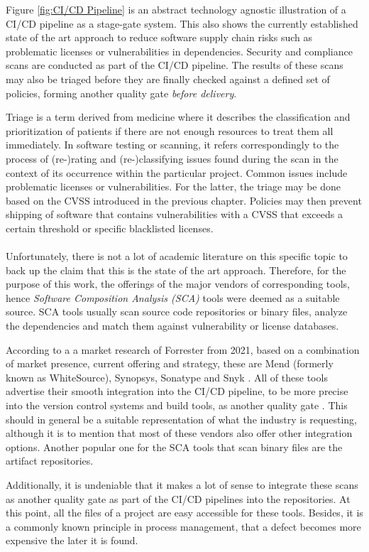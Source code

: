Figure \ref{fig:CI/CD Pipeline} is an abstract technology agnostic illustration of a CI/CD pipeline as a stage-gate system. This also shows the currently established state of the art approach to reduce software supply chain risks such as problematic licenses or vulnerabilities in dependencies. Security and compliance scans are conducted as part of the CI/CD pipeline. The results of these scans may also be triaged before they are finally checked against a defined set of policies, forming another quality gate \emph{before delivery}.\par 
Triage is a term derived from medicine where it describes the classification and prioritization of patients if there are not enough resources to treat them all immediately. In software testing or scanning, it refers correspondingly to the process of (re-)rating and (re-)classifying issues found during the scan in the context of its occurrence within the particular project. Common issues include problematic licenses or vulnerabilities. For the latter, the triage may be done based on the CVSS introduced in the previous chapter. Policies may then prevent shipping of software that contains vulnerabilities with a CVSS that exceeds a certain threshold or specific blacklisted licenses.\\\\
Unfortunately, there is not a lot of academic literature on this specific topic to back up the claim that this is the state of the art approach. Therefore, for the purpose of this work, the offerings of the major vendors of corresponding tools, hence \emph{Software Composition Analysis (SCA)} tools were deemed as a suitable source. SCA tools usually scan source code repositories or binary files, analyze the dependencies and match them against vulnerability or license databases.\par
According to a a market research of Forrester from 2021, based on a combination of market presence, current offering and strategy, these are Mend (formerly known as WhiteSource), Synopsys, Sonatype and Snyk \cite{ForresterSCA}. All of these tools advertise their smooth integration into the CI/CD pipeline, to be more precise into the version control systems and build tools, as another quality gate \cite{MendIntegration, BDBAIntegration, SonatypeIntegration, SnykIntegration}. This should in general be a suitable representation of what the industry is requesting, although it is to mention that most of these vendors also offer other integration options. Another popular one for the SCA tools that scan binary files are the artifact repositories.\par 
Additionally, it is undeniable that it makes a lot of sense to integrate these scans as another quality gate as part of the CI/CD pipelines into the repositories. At this point, all the files of a project are easy accessible for these tools. Besides, it is a commonly known principle in process management, that a defect becomes more expensive the later it is found.\par 
 

